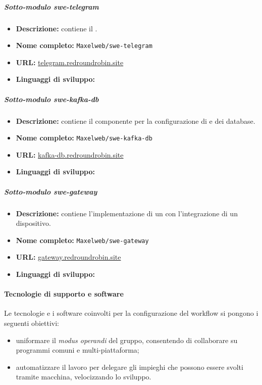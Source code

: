 		\subparagraph{Sotto-modulo swe-telegram}

		\begin{itemize}
		 	\item \textbf{Descrizione:} contiene il .
		 	\item \textbf{Nome completo:} \verb!Maxelweb/swe-telegram!
		 	\item \textbf{URL:} \href{https://github.com/Maxelweb/swe-telegram}{telegram.redroundrobin.site}
		 	\item \textbf{Linguaggi di sviluppo:} 
		 \end{itemize}

		\subparagraph{Sotto-modulo swe-kafka-db}

		\begin{itemize}
		 	\item \textbf{Descrizione:} contiene il componente per la configurazione di  e dei database.
		 	\item \textbf{Nome completo:} \verb!Maxelweb/swe-kafka-db!
		 	\item \textbf{URL:} \href{https://github.com/Maxelweb/swe-kafka-db}{kafka-db.redroundrobin.site}
		 	\item \textbf{Linguaggi di sviluppo:} 
		 \end{itemize}

		 \subparagraph{Sotto-modulo swe-gateway}

		\begin{itemize}
		 	\item \textbf{Descrizione:} contiene l'implementazione di un  con l'integrazione di un dispositivo.
		 	\item \textbf{Nome completo:} \verb!Maxelweb/swe-gateway!
		 	\item \textbf{URL:} \href{https://github.com/Maxelweb/swe-gateway}{gateway.redroundrobin.site}
		 	\item \textbf{Linguaggi di sviluppo:} 
		 \end{itemize}


	\paragraph{Tecnologie di supporto e software}

	Le tecnologie e i software coinvolti per la configurazione del workflow si pongono i seguenti obiettivi:
	\begin{itemize}
		\item uniformare il \textit{modus operandi} del gruppo, consentendo di collaborare su programmi comuni e multi-piattaforma;
		\item automatizzare il lavoro per delegare gli impieghi che possono essere svolti tramite macchina, velocizzando lo sviluppo.
	\end{itemize}


